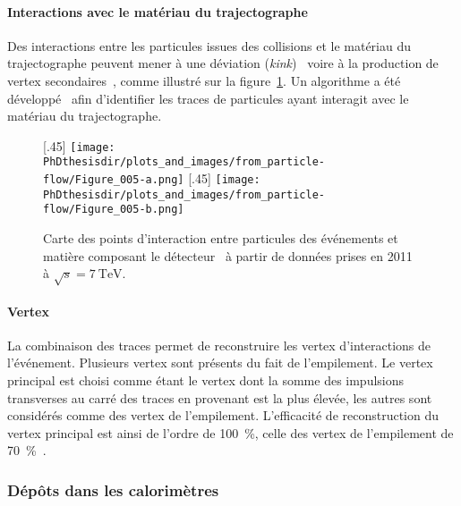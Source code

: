 \paragraph{Interactions avec le matériau du trajectographe}
Des interactions entre les particules issues des collisions et le matériau du trajectographe peuvent mener
à une déviation (\emph{kink})~\cite{moliere_scat_1,moliere_scat_2}
voire
à la production de vertex secondaires~\cite{particle-flow,CMS-TRK-17-001},
comme illustré sur la figure~\ref{fig-chapter-LHC-section-evt_reco-subsec-PF_elements-CMS-self-radio}.
Un algorithme a été développé~\cite{CMS-PAS-TRK-10-003} afin d'identifier les traces de particules ayant interagit avec le matériau du trajectographe.
\begin{figure}[h]
\centering
{}[.45\textwidth]
{\texttt{[image: \\PhDthesisdir/plots\_and\_images/from\_particle-flow/Figure\_005-a.png]}}
\hfill
{}[.45\textwidth]
{\texttt{[image: \\PhDthesisdir/plots\_and\_images/from\_particle-flow/Figure\_005-b.png]}}
\caption[Points d'interaction entre particules des événements et matière du détecteur.]{Carte des points d'interaction entre particules des événements et matière composant le détecteur~\cite{particle-flow,CMS-TRK-17-001} à partir de données prises en 2011 à $\sqrt{s}=\SI{7}{\TeV}$.}
\label{fig-chapter-LHC-section-evt_reco-subsec-PF_elements-CMS-self-radio}
\end{figure}
\paragraph{Vertex}
La combinaison des traces permet de reconstruire les vertex d'interactions de l'événement.
Plusieurs vertex sont présents du fait de l'empilement.
Le vertex principal est choisi comme étant le vertex dont la somme des impulsions transverses au carré des traces en provenant est la plus élevée, les autres sont considérés comme des vertex de l'empilement.
L'efficacité de reconstruction du vertex principal est ainsi de l'ordre de \SI{100}{\%}, celle des vertex de l'empilement de \SI{70}{\%}~\cite{JERC_RunI}.
\subsubsection{Dépôts dans les calorimètres}
